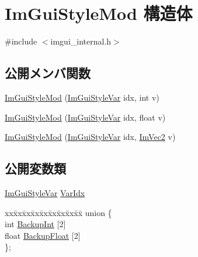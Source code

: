 \hypertarget{struct_im_gui_style_mod}{}\section{Im\+Gui\+Style\+Mod 構造体}
\label{struct_im_gui_style_mod}


{\ttfamily \#include $<$imgui\+\_\+internal.\+h$>$}

\subsection*{公開メンバ関数}
\begin{DoxyCompactItemize}
\item 
\mbox{\hyperlink{struct_im_gui_style_mod_ae9987273b247f021020034256364bec8}{Im\+Gui\+Style\+Mod}} (\mbox{\hyperlink{imgui_8h_ac919acabce24faae590e295b424874ca}{Im\+Gui\+Style\+Var}} idx, int v)
\item 
\mbox{\hyperlink{struct_im_gui_style_mod_a737c3fad802a8d5d4616f9decc7e402d}{Im\+Gui\+Style\+Mod}} (\mbox{\hyperlink{imgui_8h_ac919acabce24faae590e295b424874ca}{Im\+Gui\+Style\+Var}} idx, float v)
\item 
\mbox{\hyperlink{struct_im_gui_style_mod_a28647cc4ab8b95b8ee30e0fc7401ae07}{Im\+Gui\+Style\+Mod}} (\mbox{\hyperlink{imgui_8h_ac919acabce24faae590e295b424874ca}{Im\+Gui\+Style\+Var}} idx, \mbox{\hyperlink{struct_im_vec2}{Im\+Vec2}} v)
\end{DoxyCompactItemize}
\subsection*{公開変数類}
\begin{DoxyCompactItemize}
\item 
\mbox{\hyperlink{imgui_8h_ac919acabce24faae590e295b424874ca}{Im\+Gui\+Style\+Var}} \mbox{\hyperlink{struct_im_gui_style_mod_ab23c55941dbd0e156ce640a8fecb2feb}{Var\+Idx}}
\item 
\begin{tabbing}
xx\=xx\=xx\=xx\=xx\=xx\=xx\=xx\=xx\=\kill
union \{\\
\>int \mbox{\hyperlink{struct_im_gui_style_mod_a60491c95989b2a866ebb76403a562f6f}{BackupInt}} \mbox{[}2\mbox{]}\\
\>float \mbox{\hyperlink{struct_im_gui_style_mod_af36b5cf1100de970d78a53db937be949}{BackupFloat}} \mbox{[}2\mbox{]}\\
\}; \\

\end{tabbing}\end{DoxyCompactItemize}


